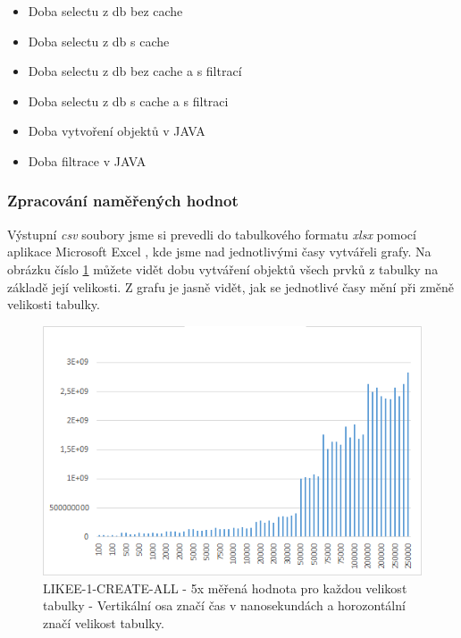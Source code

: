 \documentclass[a4paper, 11pt]{article}
\begin{document}
\begin{itemize}
\item Doba selectu z db bez cache
\item Doba selectu z db s cache
\item Doba selectu z db bez cache a s filtrací
\item Doba selectu z db s cache a s filtraci
\item Doba vytvoření objektů v JAVA
\item Doba filtrace v JAVA

\end{itemize}
 
\subsubsection{Zpracování naměřených hodnot}
Výstupní \textit{csv} soubory jsme si prevedli do tabulkového formatu \textit{xlsx} pomocí aplikace Microsoft Excel \cite{excel}, kde jsme nad jednotlivými časy vytvářeli grafy. Na obrázku číslo \ref{sec:obr1} můžete vidět dobu vytváření objektů všech prvků z tabulky na základě její velikosti. Z grafu je jasně vidět, jak se jednotlivé časy mění při změně velikosti tabulky. 


\begin{figure}[H]
\centering
\includegraphics[width=150mm, frame]{images/LIKEE-1-CREATE-ALL.png}
\caption{LIKEE-1-CREATE-ALL - 5x měřená hodnota pro každou velikost tabulky - Vertikální osa značí čas v nanosekundách a horozontální značí velikost tabulky.}
\label{sec:obr1}
\end{figure}
\end{document}

